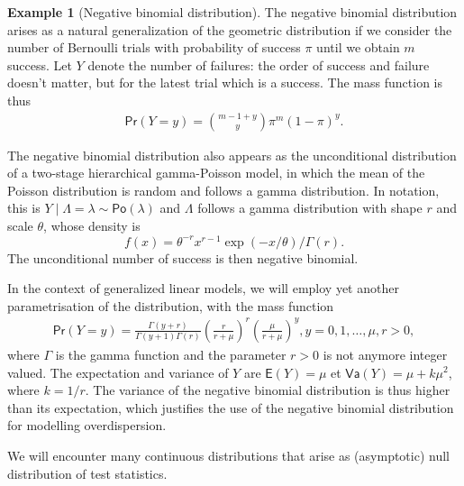 \documentclass[
  11pt,
  letterpaper,
]{book}
\theoremstyle{definition}
\theoremstyle{definition}
\newtheorem{example}{Example}[chapter]
\theoremstyle{definition}
\theoremstyle{remark}
\begin{document}
\begin{example}[Negative binomial distribution]
\protect\hypertarget{exm:negbindist}{}{\label{exm:negbindist} {} }The negative binomial distribution arises as a natural generalization of the geometric distribution if we consider the number of Bernoulli trials with probability of success \(\pi\) until we obtain \(m\) success. Let \(Y\) denote the number of failures: the order of success and failure doesn't matter, but for the latest trial which is a success. The mass function is thus
\begin{align*}
\mathsf{Pr}(Y=y)= \binom{m-1+y}{y} \pi^m (1-\pi)^{y}.
\end{align*}

The negative binomial distribution also appears as the unconditional distribution of a two-stage hierarchical gamma-Poisson model, in which the mean of the Poisson distribution is random and follows a gamma distribution. In notation, this is \(Y \mid \Lambda=\lambda \sim \mathsf{Po}(\lambda)\) and \(\Lambda\) follows a gamma distribution with shape \(r\) and scale \(\theta\), whose density is \[f(x) = \theta^{-r}x^{r-1}\exp(-x/\theta)/\Gamma(r).\] The unconditional number of success is then negative binomial.

In the context of generalized linear models, we will employ yet another parametrisation of the distribution, with the mass function
\begin{align*}
\mathsf{Pr}(Y=y)=\frac{\Gamma(y+r)}{\Gamma(y+1)\Gamma(r)} \left(\frac{r}{r + \mu} \right)^{r} \left(\frac{\mu}{r+\mu}\right)^y, y=0, 1, \ldots, \mu,r >0,
\end{align*}
where \(\Gamma\) is the gamma function and the parameter \(r>0\) is not anymore integer valued. The expectation and variance of \(Y\) are
\(\mathsf{E}(Y)=\mu\) et \(\mathsf{Va}(Y)=\mu+k\mu^2\), where \(k=1/r\). The variance of the negative binomial distribution is thus higher than its expectation, which justifies the use of the negative binomial distribution for modelling overdispersion.
\end{example}

We will encounter many continuous distributions that arise as (asymptotic) null distribution of test statistics.
\end{document}
